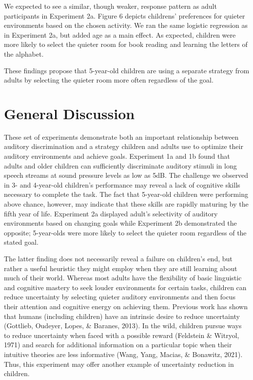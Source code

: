 \documentclass[10pt, letterpaper]{article}
\begin{document}
We expected to see a similar, though weaker, response pattern as adult
participants in Experiment 2a. Figure 6 depicts childrens' preferences
for quieter environments based on the chosen activity. We ran the same
logistic regression as in Experiment 2a, but added age as a main effect.
As expected, children were more likely to select the quieter room for
book reading and learning the letters of the alphabet.

These findings propose that 5-year-old children are using a separate
strategy from adults by selecting the quieter room more often regardless
of the goal.

\hypertarget{general-discussion}{%
\section{General Discussion}\label{general-discussion}}

These set of experiments demonstrate both an important relationship
between auditory discrimination and a strategy children and adults use
to optimize their auditory environments and achieve goals. Experiment 1a
and 1b found that adults and older children can sufficiently
discriminate auditory stimuli in long speech streams at sound pressure
levels as low as 5dB. The challenge we observed in 3- and 4-year-old
children's performance may reveal a lack of cognitive skills necessary
to complete the task. The fact that 5-year-old children were performing
above chance, however, may indicate that these skills are rapidly
maturing by the fifth year of life. Experiment 2a displayed adult's
selectivity of auditory environments based on changing goals while
Experiment 2b demonstrated the opposite; 5-year-olds were more likely to
select the quieter room regardless of the stated goal.

The latter finding does not necessarily reveal a failure on children's
end, but rather a useful heuristic they might employ when they are still
learning about much of their world. Whereas most adults have the
flexibility of basic linguistic and cognitive mastery to seek louder
environments for certain tasks, children can reduce uncertainty by
selecting quieter auditory environments and then focus their attention
and cognitive energy on achieving them. Previous work has shown that
humans (including children) have an intrinsic desire to reduce
uncertainty (Gottlieb, Oudeyer, Lopes, \& Baranes, 2013). In the wild,
children pursue ways to reduce uncertainty when faced with a possible
reward (Feldstein \& Witryol, 1971) and search for additional
information on a particular topic when their intuitive theories are less
informative (Wang, Yang, Macias, \& Bonawitz, 2021). Thus, this
experiment may offer another example of uncertainty reduction in
children.
\end{document}
